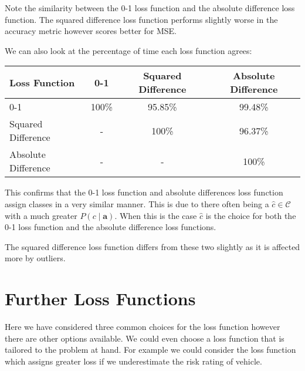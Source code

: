 Note the similarity between the 0-1 loss function and the absolute difference loss function.
The squared difference loss function performs slightly worse in the accuracy metric however scores better for MSE.

We can also look at the percentage of time each loss function agrees:
\begin{center}
\begin{tabular}{l|c c c}
	Loss Function       & 0-1     & Squared Difference & Absolute Difference   \\
	\hline
	0-1                 & 100\% & 95.85\% & 99.48\% \\
	Squared Difference  & - & 100\% & 96.37\%\\
	Absolute Difference & - & - & 100\% \\
\end{tabular}
\end{center}

This confirms that the 0-1 loss function and absolute differences loss function assign classes in a very similar manner.
This is due to there often being a $\hat{c} \in \mathcal{C}$ with a much greater $P(c \mid \mathbf{a})$.
When this is the case $\hat{c}$ is the choice for both the 0-1 loss function and the absolute difference loss functions.

The squared difference loss function differs from these two slightly as it is affected more by outliers.

\section{Further Loss Functions}
Here we have considered three common choices for the loss function however there are other options available.
We could even choose a loss function that is tailored to the problem at hand.
For example we could consider the loss function which assigns greater loss if we underestimate the risk rating of vehicle.